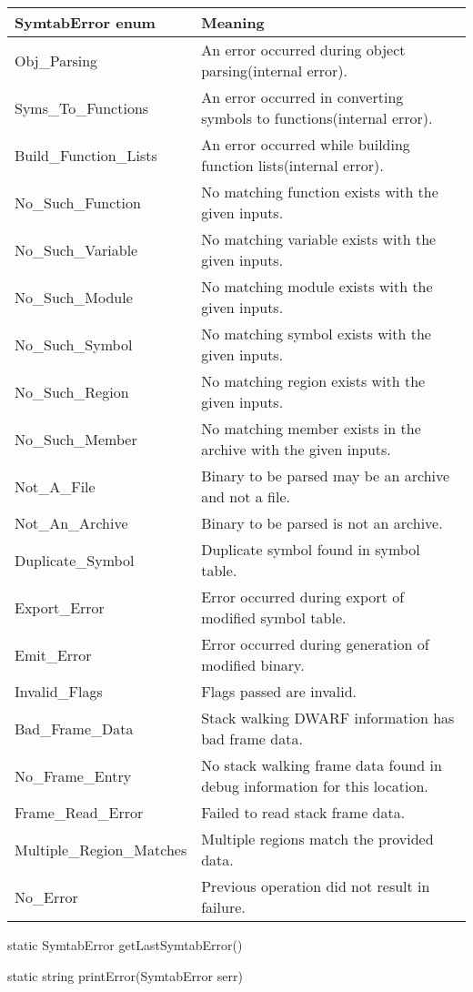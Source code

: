 \begin{center}
\begin{tabular}{ll}
\toprule
SymtabError enum& Meaning\\
\midrule
Obj\_Parsing & An error occurred during object parsing(internal error).\\
Syms\_To\_Functions & An error occurred in converting symbols to functions(internal error).\\
Build\_Function\_Lists & An error occurred while building function lists(internal error).\\
No\_Such\_Function & No matching function exists with the given inputs.\\
No\_Such\_Variable & No matching variable exists with the given inputs.\\
No\_Such\_Module & No matching module exists with the given inputs.\\
No\_Such\_Symbol & No matching symbol exists with the given inputs.\\
No\_Such\_Region & No matching region exists with the given inputs.\\
No\_Such\_Member & No matching member exists in the archive with the given inputs.\\
Not\_A\_File & Binary to be parsed may be an archive and not a file.\\
Not\_An\_Archive & Binary to be parsed is not an archive.\\
Duplicate\_Symbol & Duplicate symbol found in symbol table.\\
Export\_Error & Error occurred during export of modified symbol table. \\
Emit\_Error & Error occurred during generation of modified binary. \\
Invalid\_Flags & Flags passed are invalid.\\
Bad\_Frame\_Data & Stack walking DWARF information has bad frame data.\\
No\_Frame\_Entry & No stack walking frame data found in debug information for this location.\\
Frame\_Read\_Error & Failed to read stack frame data.\\
Multiple\_Region\_Matches & Multiple regions match the provided data. \\ 
No\_Error & Previous operation did not result in failure.\\
\bottomrule
\end{tabular}
\end{center}

\begin{apient}
static SymtabError getLastSymtabError()
\end{apient}

\begin{apient}
static string printError(SymtabError serr)
\end{apient}
